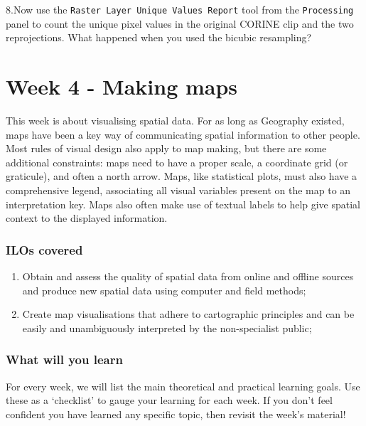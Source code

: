 \documentclass[
  letterpaper,
  DIV=11,
  numbers=noendperiod]{scrreprt}
\begin{document}
8.Now use the \texttt{Raster\ Layer\ Unique\ Values\ Report} tool from
the \texttt{Processing} panel to count the unique pixel values in the
original CORINE clip and the two reprojections. What happened when you
used the bicubic resampling?

\part{Week 4 - Making maps}

This week is about visualising spatial data. For as long as Geography
existed, maps have been a key way of communicating spatial information
to other people. Most rules of visual design also apply to map making,
but there are some additional constraints: maps need to have a proper
scale, a coordinate grid (or graticule), and often a north arrow. Maps,
like statistical plots, must also have a comprehensive legend,
associating all visual variables present on the map to an interpretation
key. Maps also often make use of textual labels to help give spatial
context to the displayed information.

\section*{ILOs covered}\label{ilos-covered-3}


\begin{enumerate}
\def\labelenumi{\arabic{enumi}.}
\setcounter{enumi}{1}
\item
  Obtain and assess the quality of spatial data from online and offline
  sources and produce new spatial data using computer and field methods;
\item
  Create map visualisations that adhere to cartographic principles and
  can be easily and unambiguously interpreted by the non-specialist
  public;
\end{enumerate}

\section*{What will you learn}\label{what-will-you-learn-3}


For every week, we will list the main theoretical and practical learning
goals. Use these as a `checklist' to gauge your learning for each week.
If you don't feel confident you have learned any specific topic, then
revisit the week's material!
\end{document}
